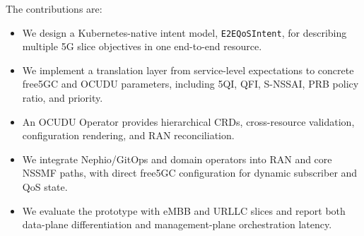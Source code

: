 The contributions are:
\begin{itemize}
  \item We design a Kubernetes-native intent model, \texttt{E2EQoSIntent}, for describing multiple 5G slice objectives in one end-to-end resource.
  \item We implement a translation layer from service-level expectations to concrete free5GC and OCUDU parameters, including 5QI, QFI, S-NSSAI, PRB policy ratio, and priority.
  \item An OCUDU Operator provides hierarchical CRDs, cross-resource validation, configuration rendering, and RAN reconciliation.
  \item We integrate Nephio/GitOps and domain operators into RAN and core NSSMF paths, with direct free5GC configuration for dynamic subscriber and QoS state.
  \item We evaluate the prototype with eMBB and URLLC slices and report both data-plane differentiation and management-plane orchestration latency.
\end{itemize}

